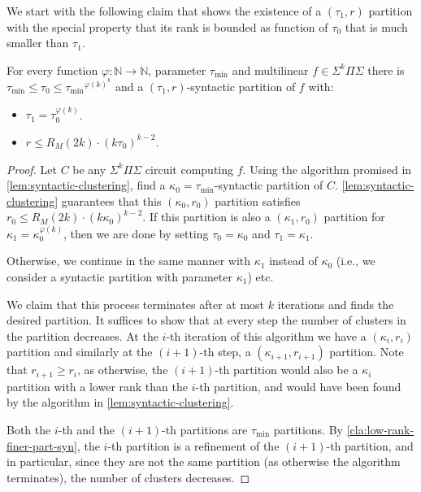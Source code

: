 \documentclass[12pt]{article}
\newcommand{\Sps}[1]{\Sigma^{#1} \Pi\Sigma}
\begin{document}
	We start with the following claim that shows the existence of a $(\tau_1,r)$ partition with the special property that its rank is bounded as function of $\tau_0$ that is much smaller than $\tau_1$.
	
	
	\begin{claim}
		\label{cl:partition-two-taus-syn}
		For every function $\varphi: \mathbb{N} \to \mathbb{N}$, parameter $\tau_\text{min}$ and  multilinear $f \in \Sps{k}$ there is $\tau_\text{min}\leq \tau_0 \le {\tau_\text{min}}^{ \varphi(k)^k}$ and a $({\tau_1}, r)$-syntactic partition of $f$ with:
		\begin{itemize}
			\item ${\tau_1} = \tau_0^{\varphi(k)}$.
			\item $r \le  R_M(2k) \cdot  (k\tau_0)^{k-2}$.
		\end{itemize}
	\end{claim}
	
	\begin{proof}
		Let $C$ be any $\Sps{k}$ circuit computing $f$.
		Using the algorithm promised in \autoref{lem:syntactic-clustering}, find a $\kappa_0=\tau_\text{min}$-syntactic partition of $C$.
		\autoref{lem:syntactic-clustering} guarantees that  this $(\kappa_0, r_0)$ partition satisfies $r_0 \le R_M(2k) \cdot  (k\kappa_0)^{k-2}$. If this partition is also a $(\kappa_1, r_0)$ partition for $\kappa_1 = \kappa_0^{\varphi(k)}$, then we are done by setting $\tau_0=\kappa_0$ and $\tau_1=\kappa_1$.
		
		Otherwise, we continue in the same manner with $\kappa_1$ instead of $\kappa_0$ (i.e., we consider a syntactic partition with parameter $\kappa_1$) etc. 
		
		We claim that this process terminates after at most $k$ iterations and finds the desired partition. It suffices to show that at every step the number of  clusters in the partition decreases.
		At the $i$-th iteration of this algorithm we have a $(\kappa_i, r_i)$ partition and similarly at the $(i+1)$-th step, a $(\kappa_{i+1}, r_{i+1})$ partition.
		Note that $r_{i+1} \ge r_i$, as otherwise, the $(i+1)$-th partition would also be a $\kappa_i$ partition with a lower rank than the $i$-th partition, and would have been found by the algorithm in \autoref{lem:syntactic-clustering}.
		
		Both the $i$-th and the $(i+1)$-th partitions are $\tau_\text{min}$ partitions. By \autoref{cla:low-rank-finer-part-syn}, the $i$-th partition is a refinement of the $(i+1)$-th partition, and in particular, since they are not the same partition (as otherwise the algorithm terminates), the number of clusters decreases.
	\end{proof}
	
\end{document}
